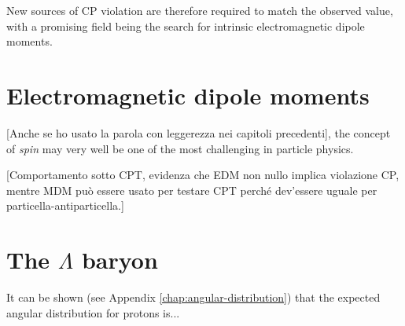 New sources of CP violation are therefore required to match the observed value, with a promising field being the search for intrinsic electromagnetic dipole moments.

\section{Electromagnetic dipole moments}

[Anche se ho usato la parola con leggerezza nei capitoli precedenti], the concept of \textit{spin} may very well be one of the most challenging in particle physics.

[Comportamento sotto CPT, evidenza che EDM non nullo implica violazione CP, mentre MDM può essere usato per testare CPT perché dev'essere uguale per particella-antiparticella.]



\section{The \texorpdfstring{$\Lambda$}{Lambda} baryon}

It can be shown (see Appendix \ref{chap:angular-distribution}) that the expected angular distribution for protons is...